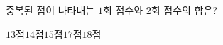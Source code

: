 중복된 점이 나타내는 $1$회 점수와 $2$회 점수의 합은?
\begin{choices32}{$13$점}{$14$점}{$15$점}{$17$점}{$18$점}\end{choices32}
